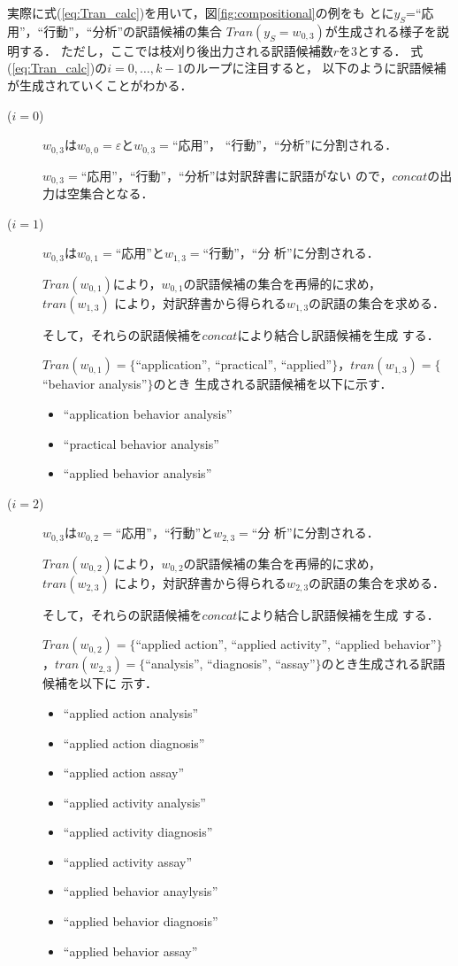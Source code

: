 \documentclass[japanese]{jnlp_1.3a}
\begin{document}
実際に式(\ref{eq:Tran_calc})を用いて，図\ref{fig:compositional}の例をも
とに$y_S$=“応用”，“行動”，“分析”の訳語候補の集合
$Tran(y_S=w_{0,3})$が生成される様子を説明する．
ただし，ここでは枝刈り後出力される訳語候補数$r$を3とする．
式(\ref{eq:Tran_calc})の$i=0,\ldots,k-1$のループに注目すると，
以下のように訳語候補が生成されていくことがわかる．
\begin{description}
 \item[($i=0$)] $w_{0,3}$は$w_{0,0}=\varepsilon$と$w_{0,3}=$“応用”，
	    “行動”，“分析”に分割される．
	    
	    $w_{0,3}=$“応用”，“行動”，“分析”は対訳辞書に訳語がない
	    ので，$concat$の出力は空集合となる．
 \item[($i=1$)] $w_{0,3}$は$w_{0,1}=$“応用”と$w_{1,3}=$“行動”，“分
	    析”に分割される．
	    
	    $Tran(w_{0,1})$により，$w_{0,1}$の訳語候補の集合を再帰的に求め，
	    $tran(w_{1,3})$
	    により，対訳辞書から得られる$w_{1,3}$の訳語の集合を求める．
	    
	    そして，それらの訳語候補を$concat$により結合し訳語候補を生成
	    する．
	    
	    $Tran(w_{0,1})=\{$``application'', ``practical'',
	    ``applied''$\}$，$tran(w_{1,3})=\{$``behavior analysis''$\}$のとき
	    生成される訳語候補を以下に示す．
       \begin{itemize}
	\item ``application behavior analysis''
	\item ``practical behavior analysis''
	\item ``applied behavior analysis''
       \end{itemize} 
 \item[($i=2$)] $w_{0,3}$は$w_{0,2}=$“応用”，“行動”と$w_{2,3}=$“分
	    析”に分割される．
	    
	    $Tran(w_{0,2})$により，$w_{0,2}$の訳語候補の集合を再帰的に求め，
	    $tran(w_{2,3})$
	    により，対訳辞書から得られる$w_{2,3}$の訳語の集合を求める．
	    
	    そして，それらの訳語候補を$concat$により結合し訳語候補を生成
	    する．
	    
	    $Tran(w_{0,2})=\{$``applied action'', ``applied activity'',
	    ``applied behavior''$\}$，$tran(w_{2,3})=\{$``analysis'',
	    ``diagnosis'', ``assay''$\}$のとき生成される訳語候補を以下に
	    示す．
       \begin{itemize}
	\item ``applied action analysis''
	\item ``applied action diagnosis''
	\item ``applied action assay''
	\item ``applied activity analysis''
	\item ``applied activity diagnosis''
	\item ``applied activity assay''
	\item ``applied behavior anaylysis''
	\item ``applied behavior diagnosis''
	\item ``applied behavior assay''
       \end{itemize} 
\end{description}
\end{document}
